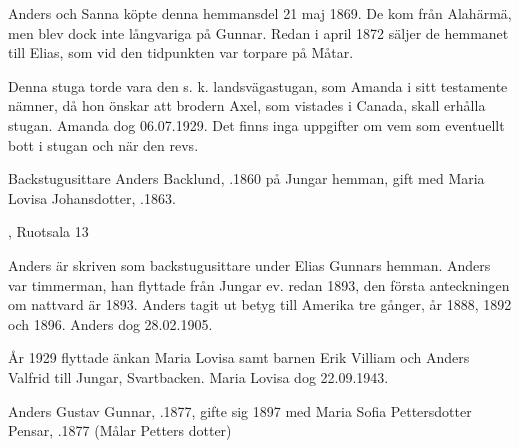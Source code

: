 Anders och Sanna köpte denna hemmansdel 21 maj 1869. De kom från Alahärmä, men blev dock inte långvariga på Gunnar. Redan i april 1872 säljer de hemmanet till Elias, som vid den tidpunkten var torpare på Måtar.



%


%
Denna stuga torde vara den s. k. landsvägastugan, som Amanda i sitt testamente nämner, då hon önskar att brodern Axel, som vistades i Canada, skall erhålla stugan. Amanda dog 06.07.1929. Det finns inga uppgifter om vem som eventuellt bott i stugan och när den revs.


%
Backstugusittare Anders Backlund, .1860 på Jungar hemman, gift med Maria Lovisa Johansdotter, .1863.
\begin{jhchildren}
  \item {}
  \item {}
  \item {}, Ruotsala 13
  \item {}
  \item {}
\end{jhchildren}

Anders är skriven som backstugusittare under Elias Gunnars hemman. Anders var timmerman, han flyttade från Jungar ev. redan 1893, den första anteckningen om nattvard är 1893. Anders tagit ut betyg till Amerika tre gånger, år 1888, 1892 och 1896. Anders dog 28.02.1905.

År 1929 flyttade änkan Maria Lovisa samt barnen Erik Villiam och Anders Valfrid till Jungar, Svartbacken. Maria Lovisa dog 22.09.1943.


%
Anders Gustav Gunnar, .1877, gifte sig 1897 med Maria Sofia Pettersdotter Pensar, .1877 (Målar Petters dotter)
\begin{jhchildren}
  \item {}
  \item {}
  \item {}
\end{jhchildren}

